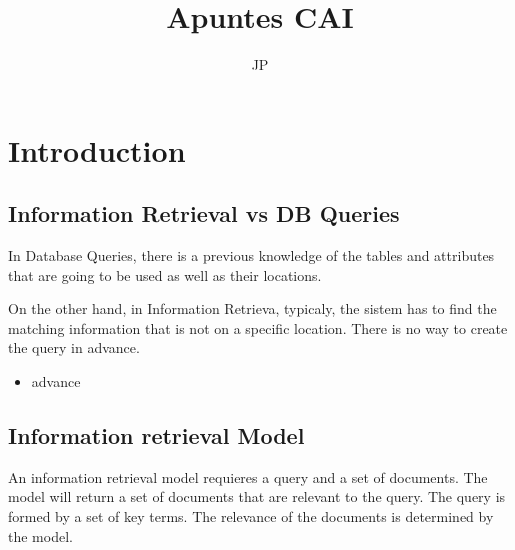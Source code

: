 \documentclass{article}
\title{Apuntes CAI}
\author{JP}
\begin{document}
\maketitle
\newpage

\tableofcontents
\newpage

    \section{Introduction}
    
    \subsection{Information Retrieval vs DB Queries}
    In Database Queries, there is a previous knowledge of the tables and attributes that are going to be used as well as their locations.
    
    On the other hand, in Information Retrieva, typicaly, the sistem has to find the matching information that is not on a specific location. There is no way to create the query in advance.

    \begin{itemize}
        \item advance
    \end{itemize}

    \subsection{Information retrieval Model}
    An information retrieval model requieres a query and a set of documents. The model will return a set of documents that are relevant to the query. The query is formed by a set of key terms. The relevance of the documents is determined by the model.
\end{document}
